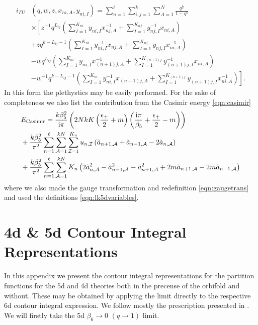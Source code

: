 \documentclass[main.tex]{subfiles}
\begin{document}
\begin{equation}
\begin{aligned}
i_{\Gamma U}&\left(q,w,z,x_{ni,A},y_{ni,I}\right)=\sum_{n=1}^{\ell}\sum_{i,j=1}^k\sum_{A=1}^N\frac{q^{\frac{1}{2}}}{1-q^k}\\
&\times\left[z^{-1}q^{L_{ij}}\left(\sum_{I=1}^{K_{ni}}y_{ni,I}x_{nj,A}^{-1}+\sum_{I=1}^{K_{nj}}y_{nj,I}^{-1}x_{ni,A}\right)\right.\\
&+zq^{k-L_{ij}-1}\left(\sum_{I=1}^{K_{ni}}y_{ni,I}^{-1}x_{nj,A}+\sum_{I=1}^{K_{nj}}y_{nj,I}x_{ni,A}^{-1}\right)\\
&-wq^{L_{ij}}\left(\sum_{I=1}^{K_{ni}}y_{ni,I}x_{(n+1)j,A}^{-1}+\sum_{I=1}^{K_{(n+1)j}}y_{(n+1)j,I}^{-1}x_{ni,A}\right)\\
&\left.-w^{-1}q^{k-L_{ij}-1}\left(\sum_{I=1}^{K_{ni}}y_{ni,I}^{-1}x_{(n+1)j,A}+\sum_{I=1}^{K_{(n+1)j}}y_{(n+1)j,I}x_{ni,A}^{-1}\right)\right].
\end{aligned}\label{eqn:orbletterfU}
\end{equation}
In this form the plethystics may be easily performed. For the sake of completeness we also list the contribution from the Casimir energy \eqref{eqn:casimir}
\begin{equation}
\begin{aligned}&E_{\text{Casimir}}=\frac{k\beta^2_5}{\mathrm{i}\pi}\left(2NkK\left(\frac{\epsilon_+}{2}+m\right)\left(\frac{\mathrm{i}\pi}{\beta_5}+\frac{\epsilon_+}{2}-m\right)\right)\\
&+\frac{k\beta_5^2}{\pi^2}\sum_{n=1}^{\ell}\sum_{\mathcal{A}=1}^{kN}\sum_{\mathcal{I}=1}^{K_n}u_{n,\mathcal{I}}\left(\tilde{a}_{n+1,\mathcal{A}}+\tilde{a}_{n-1,\mathcal{A}}-2\tilde{a}_{n,\mathcal{A}}\right)\\
&+\frac{k\beta_5^2}{\pi^2}\sum_{n=1}^{\ell}\sum_{\mathcal{A}=1}^{kN}K_n\left(2\tilde{a}_{n,\mathcal{A}}^2-\tilde{a}_{n-1,\mathcal{A}}^2-\tilde{a}_{n+1,\mathcal{A}}^2+2m\tilde{a}_{n+1,\mathcal{A}}-2m\tilde{a}_{n-1,\mathcal{A}}\right)\label{eqn:lkCasimir} 
\end{aligned}
\end{equation}
where we also made the gauge transformation and redefinition \eqref{eqn:gaugetrans} and used the definitions \eqref{eqn:lk5dvariables}.

\section{4d \& 5d Contour Integral Representations}
In this appendix we present the contour integral representations for the partition functions for the 5d and 4d theories both in the precense of the orbifold and without. These may be obtained by applying the limit directly to the respective 6d contour integral expression. We follow mostly the prescription presented in \cite{Gadde:2011ia}. We will firstly take the 5d $\beta_6\to0$ $(q\to1)$ limit.
\end{document}

